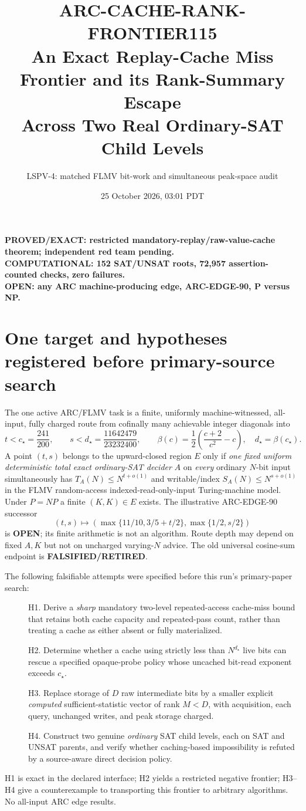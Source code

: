 \documentclass[11pt]{article}
\title{ARC-CACHE-RANK-FRONTIER115\\
\large An Exact Replay-Cache Miss Frontier and its Rank-Summary Escape\\
Across Two Real Ordinary-SAT Child Levels}
\author{LSPV-4: matched FLMV bit-work and simultaneous peak-space audit}
\date{25 October 2026, 03:01 PDT}
\newcommand{\OPEN}{\textbf{OPEN}}
\begin{document}
\maketitle
\begin{center}
\textbf{PROVED/EXACT: restricted mandatory-replay/raw-value-cache theorem;
independent red team pending.}\\
\textbf{COMPUTATIONAL: 152 SAT/UNSAT roots, 72,957 assertion-counted
checks, zero failures.}\\
\textbf{OPEN: any ARC machine-producing edge, ARC-EDGE-90, P versus NP.}
\end{center}

\section{One target and hypotheses registered before primary-source search}
The one active ARC/FLMV task is a finite, uniformly machine-witnessed,
all-input, fully charged route from cofinally many achievable integer
diagonals into
\[
t<c_\star=\frac{241}{200},\qquad
s<d_\star=\frac{11642479}{23232400},\qquad
\beta(c)=\frac12\left(\frac{c+2}{c^2}-c\right),
\quad d_\star=\beta(c_\star).
\]
A point $(t,s)$ belongs to the upward-closed region $E$ only if
\emph{one fixed uniform deterministic total exact ordinary-SAT decider}
$A$ on \emph{every} ordinary $N$-bit input simultaneously has
$T_A(N)\le N^{t+o(1)}$ and writable/index
$S_A(N)\le N^{s+o(1)}$ in the FLMV random-access indexed-read-only-input
Turing-machine model. Under $P=NP$ a finite $(K,K)\in E$ exists.
The illustrative ARC-EDGE-90 successor
\[
(t,s)\longmapsto
\left(\max\{11/10,3/5+t/2\},\max\{1/2,s/2\}\right)
\]
is \OPEN; its finite arithmetic is not an algorithm.  Route depth may
depend on fixed $A,K$ but not on uncharged varying-$N$ advice. The
old universal cosine-sum endpoint is \textbf{FALSIFIED/RETIRED}.

The following falsifiable attempts were specified before this run's
primary-paper search:
\begin{description}
\item[] H1. Derive a \emph{sharp} mandatory two-level repeated-access
cache-miss bound that retains both cache capacity and repeated-pass
count, rather than treating a cache as either absent or fully materialized.
\item[] H2. Determine whether a cache using strictly less than
$N^{d_\star}$ live bits can rescue a specified opaque-probe policy whose
uncached bit-read exponent exceeds $c_\star$.
\item[] H3. Replace storage of $D$ raw intermediate bits by a smaller
explicit \emph{computed} sufficient-statistic vector of rank $M<D$,
with acquisition, each query, unchanged writes, and peak storage charged.
\item[] H4. Construct two genuine \emph{ordinary} SAT child levels,
each on SAT and UNSAT parents, and verify whether caching-based
impossibility is refuted by a source-aware direct decision policy.
\end{description}
H1 is exact in the declared interface; H2 yields a restricted negative
frontier; H3--H4 give a counterexample to transporting this frontier to
arbitrary algorithms. No all-input ARC edge results.
\end{document}
